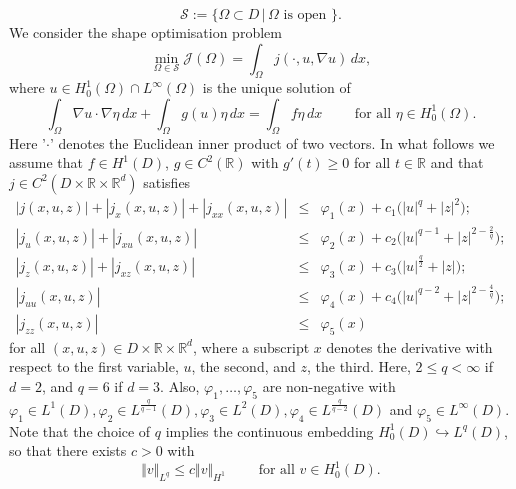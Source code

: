 \documentclass[10pt,a4paper]{amsart}
\newcommand{\dx}{\,dx}
\begin{document}
\begin{displaymath}
\mathcal S:= \lbrace \Omega \subset D \, | \, \Omega \mbox{ is open } \rbrace.
\end{displaymath}
\noindent
We consider the shape optimisation problem
\begin{displaymath}
\min_{\Omega \in \mathcal S} \mathcal J(\Omega) = \int_{\Omega} j(\cdot,u,\nabla u)  \dx,
\end{displaymath}
where $u \in H^1_0(\Omega)\cap L^\infty(\Omega)$ is the unique solution of 
\begin{equation} \label{state}
\int_{\Omega} \nabla u \cdot \nabla \eta  \dx + \int_{\Omega} g(u) \eta \dx  = \int_{\Omega }f \eta \dx  \qquad \mbox{ for all } \eta \in H^1_0(\Omega).
\end{equation}
Here  '$\cdot$' denotes the Euclidean inner product of two vectors. 
In what follows we assume that $f \in H^1(D)$, $g \in C^2(\mathbb{R})$ with $g'(t) \ge 0$ for all $t \in \mathbb R$ and that $j \in C^2(D \times \mathbb R \times \mathbb R^d)$ satisfies 
\begin{eqnarray}
| j(x,u,z) | + | j_x(x,u,z)| + | j_{xx}(x,u,z)|  & \leq  & \varphi_1(x)+ c_1 \bigl( | u|^q + |z|^2 \bigr); \label{jest} \\
| j_u(x,u,z) | + | j_{xu}(x,u,z) | & \leq  &  \varphi_2(x) + c_2 \bigl(  |u |^{q-1} + | z|^{2-\frac{2}{q}} \bigr);   \label{j1est} \\
| j_z(x,u,z) | + | j_{xz}(x,u,z) |  & \leq   & \varphi_3(x) + c_3 \bigl( |u|^{\frac{q}{2}} + |z| \bigr);  \label{j2est}   \\
| j_{uu}(x,u,z) | & \leq  &\varphi_4(x) + c_4 \bigl( |u|^{q-2} + |z|^{2- \frac{4}{q}} \bigr); \label{j3est} \\
  | j_{zz}(x,u,z) | & \leq & \varphi_5(x) \label{j4est}
\end{eqnarray}
for all $(x,u,z) \in  D \times  \mathbb R \times \mathbb R^d$, {where a subscript $x$ denotes the derivative with respect to the first variable, $u$, the second, and $z$, the third}.
Here, $2 \leq q < \infty$ if $d=2$, and $q= 6$ if $d =3$. Also, $\varphi_1,\ldots,\varphi_5$ are non-negative with 
$\varphi_1 \in L^1(D), \varphi_2 \in L^{\frac{q}{q-1}}(D), \varphi_3 \in L^2(D), \varphi_4 \in L^{\frac{q}{q-2}}(D)$ and 
$\varphi_5 \in L^\infty(D)$.
{Note that the choice of $q$ implies the continuous embedding $H^1_0(D) \hookrightarrow L^q(D)$, so that there exists $c>0$ with
\begin{equation} \label{Dembed}
\Vert v \Vert_{L^q} \leq c \Vert v \Vert_{H^1} \qquad \mbox{ for all } v \in H^1_0(D).
\end{equation} } 
\end{document}
